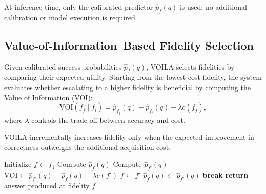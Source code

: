 At inference time, only the calibrated predictor $\hat{p}_f(q)$ is used; no additional
calibration or model execution is required.

\subsection{Value-of-Information–Based Fidelity Selection}

Given calibrated success probabilities $\hat{p}_f(q)$, VOILA selects fidelities by
comparing their expected utility.
Starting from the lowest-cost fidelity, the system evaluates whether escalating to a
higher fidelity is beneficial by computing the Value of Information (VOI):
\[
\mathrm{VOI}(f_j \mid f_i)
=
\hat{p}_{f_j}(q) - \hat{p}_{f_i}(q) - \lambda c(f_j),
\]
where $\lambda$ controls the trade-off between accuracy and cost.

VOILA incrementally increases fidelity only when the expected improvement in correctness
outweighs the additional acquisition cost.

\begin{algorithm}[t]
\caption{VOILA Inference Procedure}
\label{alg:voila}
\begin{algorithmic}[1]
\STATE Initialize $f \leftarrow f_1$
\STATE Compute $\hat{p}_f(q)$
    \STATE Compute $\hat{p}_{f'}(q)$
    \STATE $\mathrm{VOI} \leftarrow \hat{p}_{f'}(q) - \hat{p}_f(q) - \lambda c(f')$
        \STATE $f \leftarrow f'$
        \STATE $\hat{p}_f(q) \leftarrow \hat{p}_{f'}(q)$
    \ELSE
        \STATE \textbf{break}
    \ENDIF
\ENDFOR
\STATE \textbf{return} answer produced at fidelity $f$
\end{algorithmic}
\end{algorithm}
